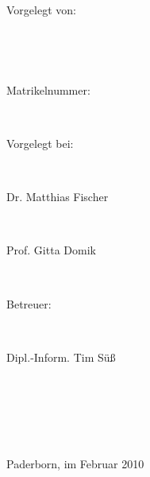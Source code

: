 \begin{titlepage}
\begin{center}
\begin{normalsize}Vorgelegt von: \end{normalsize} \\
\begin{Large}\dmseries\thesisauthor\end{Large} \\
\begin{normalsize}Matrikelnummer: \matrikelnr\end{normalsize} \bigskip\\
\begin{normalsize}Vorgelegt bei: \end{normalsize} \\
\begin{large}\dmseries Dr. Matthias Fischer\end{large} \\
\begin{large}\dmseries Prof. Gitta Domik\end{large}\bigskip \\
\begin{normalsize}Betreuer: \end{normalsize} \\
\begin{large}\dmseries Dipl.-Inform. Tim S\"{u}\ss\end{large} \bigskip\\
\begin{normalsize}\institut\end{normalsize}\\
\begin{normalsize}\institutsuni\end{normalsize}\bigskip \\
\begin{normalsize}Paderborn, im Februar 2010\end{normalsize}
\end{center}

\end{titlepage}
